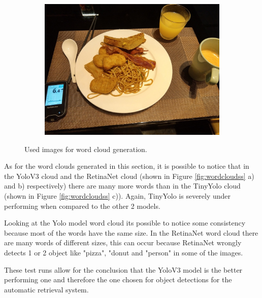 \begin{figure}[H]
\begin{subfigure}{\linewidth}
      \includegraphics[width=.3\linewidth]{Sections/4InitialWork/4_images_wordcloud/photo6.jpg}
      \end{subfigure}\par\medskip
      \caption{Used images for word cloud generation.}
      \label{fig:used_word}
    \end{figure}

    As for the word clouds generated in this section, it is possible to notice that in the YoloV3 cloud and the RetinaNet cloud (shown in Figure \ref{fig:wordcloudss} a) and b) respectively) there are many more words than in the TinyYolo cloud (shown in Figure \ref{fig:wordcloudss} c)). Again, TinyYolo is severely under performing when compared to the other 2 models.
     
    Looking at the Yolo model word cloud its possible to notice some consistency because most of the words have the same size. In the RetinaNet word cloud there are many words of different sizes, this can occur because RetinaNet wrongly detects 1 or 2 object like "pizza", "donut and "person" in some of the images.

    These test runs allow for the conclusion that the YoloV3 model is the better performing one and therefore the one chosen for object detections for the automatic retrieval system. 

